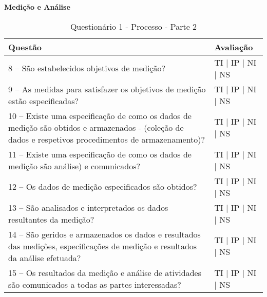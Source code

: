 \documentclass[openany,10pt,a4paper]{article}
\begin{document}
\begin{longtable}
\begin{appendix}
\begin{table}[h]
\textbf{Medição e Análise}
	\centering
	\caption{Questionário 1 - Processo - Parte 2}
	\begin{tabular}{p{3.5in}p{2in}}		
		\toprule
	
		\textbf{Questão}  & \textbf{Avaliação}\\ 
		\midrule
		8 – São estabelecidos objetivos de medição?
 & TI | IP | NI | NS \\
        \midrule
		9 – As medidas para satisfazer os objetivos de medição estão especificadas?
 & TI | IP | NI | NS \\
		\midrule
		10 – Existe uma especificação de como os dados de medição são obtidos e armazenados - 
(coleção de dados e respetivos procedimentos de armazenamento)?
 & TI | IP | NI | NS \\
		\midrule
        11 – Existe uma especificação de como os dados de medição são análise) e comunicados?
 & TI | IP | NI | NS \\
		\midrule
		12 – Os dados de medição especificados são obtidos?
  & TI | IP | NI | NS \\
		\midrule
		13 – São analisados e interpretados os dados resultantes da medição?
 & TI | IP | NI | NS \\
		\midrule
		14 – São geridos e armazenados os dados e resultados das medições, especificações de medição 
e resultados da análise efetuada?
 & TI | IP | NI | NS \\
        \midrule
        15 – Os resultados da medição e análise de atividades são comunicados a todas as partes
interessadas?
 & TI | IP | NI | NS \\
		\bottomrule
	\end{tabular} 
	\label{tab:tabela1}
\end{table}


\end{appendix}
\end{longtable}
\end{document}
